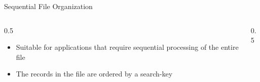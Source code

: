 \documentclass[aspectratio=169, xcolor=dvipsnames]{beamer}
\begin{document}
\begin{frame}{Sequential File Organization}
    \begin{columns}
        \begin{column}{0.5\textwidth}
            \begin{block}{}
                \begin{itemize}[<+->]
                    \item Suitable for applications that require sequential processing of the entire file
                    \item The records in the file are ordered by a search-key
                \end{itemize}
            \end{block}
        \end{column}
        \begin{column}{0.5\textwidth}
            \begin{table}[]
                \centering
            \end{table}
        \end{column}
    \end{columns}
\end{frame}
\end{document}
